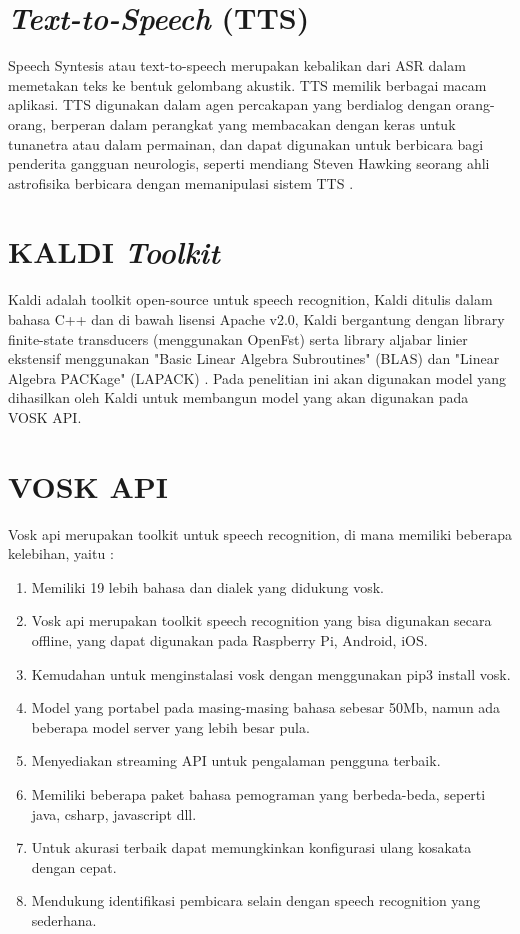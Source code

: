 \section{\textit{Text-to-Speech }(TTS)}
Speech Syntesis atau text-to-speech merupakan kebalikan dari ASR dalam memetakan teks ke bentuk gelombang akustik. TTS memilik berbagai macam aplikasi. TTS digunakan dalam agen percakapan yang berdialog dengan orang-orang, berperan dalam perangkat yang membacakan dengan keras untuk tunanetra atau dalam permainan, dan dapat digunakan untuk berbicara bagi penderita gangguan neurologis, seperti mendiang Steven Hawking seorang ahli astrofisika berbicara dengan memanipulasi sistem TTS \citep{jurafskyspeech2008}.

\section{KALDI \textit{Toolkit}}
Kaldi adalah toolkit open-source untuk speech recognition, Kaldi ditulis dalam bahasa C++ dan di bawah lisensi Apache v2.0, Kaldi bergantung dengan library finite-state transducers (menggunakan OpenFst) serta library aljabar linier ekstensif menggunakan "Basic Linear Algebra Subroutines" (BLAS) dan "Linear Algebra PACKage" (LAPACK) \citep{povey2011}. Pada penelitian ini akan digunakan model yang dihasilkan oleh Kaldi untuk membangun model yang akan digunakan pada VOSK API.


\section{VOSK API}
Vosk api merupakan toolkit untuk speech recognition, di mana memiliki beberapa kelebihan, yaitu \citep{cephei2019}:
\begin{enumerate}
\item Memiliki 19 lebih bahasa dan dialek yang didukung vosk.
\item Vosk api merupakan toolkit speech recognition yang bisa digunakan secara offline, yang dapat digunakan pada Raspberry Pi, Android, iOS.
\item Kemudahan untuk menginstalasi vosk dengan menggunakan pip3 install vosk.
\item Model yang portabel pada masing-masing bahasa sebesar 50Mb, namun ada beberapa model server yang lebih besar pula.
\item Menyediakan streaming API untuk pengalaman pengguna terbaik.
\item Memiliki beberapa paket bahasa pemograman yang berbeda-beda, seperti java, csharp, javascript dll.
\item Untuk akurasi terbaik dapat memungkinkan konfigurasi ulang kosakata dengan cepat.
\item Mendukung identifikasi pembicara selain dengan speech recognition yang sederhana.

\end{enumerate}

